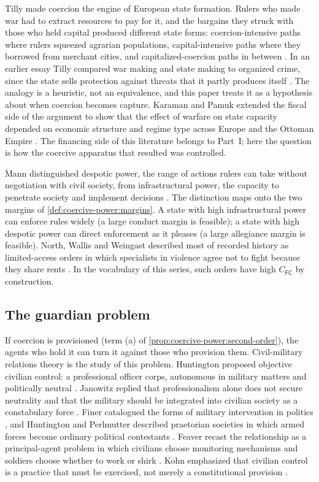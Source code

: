 \documentclass[11pt,letterpaper]{article}
\theoremstyle{definition}
\theoremstyle{remark}
\newcommand{\pF}{\mathsf{F}}
\newcommand{\pC}{\mathsf{C}}
\begin{document}
Tilly made coercion the engine of European state formation. Rulers who made war had to extract resources to pay for it, and the bargains they struck with those who held capital produced different state forms: coercion-intensive paths where rulers squeezed agrarian populations, capital-intensive paths where they borrowed from merchant cities, and capitalized-coercion paths in between \citep{tilly1990}. In an earlier essay Tilly compared war making and state making to organized crime, since the state sells protection against threats that it partly produces itself \citep{tilly1985}. The analogy is a heuristic, not an equivalence, and this paper treats it as a hypothesis about when coercion becomes capture. Karaman and Pamuk extended the fiscal side of the argument to show that the effect of warfare on state capacity depended on economic structure and regime type across Europe and the Ottoman Empire \citep{karaman2013}. The financing side of this literature belongs to Part~I; here the question is how the coercive apparatus that resulted was controlled.

Mann distinguished despotic power, the range of actions rulers can take without negotiation with civil society, from infrastructural power, the capacity to penetrate society and implement decisions \citep{mann1984}. The distinction maps onto the two margins of \cref{def:coercive-power:margins}. A state with high infrastructural power can enforce rules widely (a large conduct margin is feasible); a state with high despotic power can direct enforcement as it pleases (a large allegiance margin is feasible). North, Wallis and Weingast described most of recorded history as limited-access orders in which specialists in violence agree not to fight because they share rents \citep{nww2009}. In the vocabulary of this series, such orders have high $C_{\pF\pC}$ by construction.

\subsection{The guardian problem}

If coercion is provisioned (term (a) of \cref{prop:coercive-power:second-order}), the agents who hold it can turn it against those who provision them. Civil-military relations theory is the study of this problem. Huntington proposed objective civilian control: a professional officer corps, autonomous in military matters and politically neutral \citep{huntington1957}. Janowitz replied that professionalism alone does not secure neutrality and that the military should be integrated into civilian society as a constabulary force \citep{janowitz1960}. Finer catalogued the forms of military intervention in politics \citep{finer1962}, and Huntington and Perlmutter described praetorian societies in which armed forces become ordinary political contestants \citep{huntington1968,perlmutter1969}. Feaver recast the relationship as a principal-agent problem in which civilians choose monitoring mechanisms and soldiers choose whether to work or shirk \citep{feaver1999,feaver2003}. Kohn emphasized that civilian control is a practice that must be exercised, not merely a constitutional provision \citep{kohn1997}.
\end{document}
